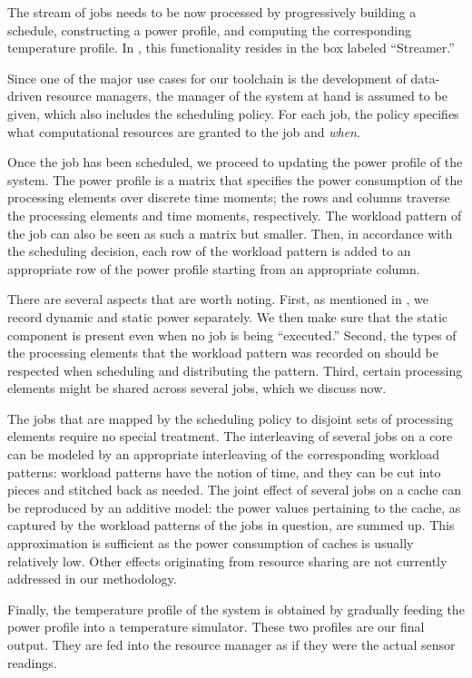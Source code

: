 The stream of jobs needs to be now processed by progressively building a
schedule, constructing a power profile, and computing the corresponding
temperature profile. In , this functionality resides in the
box labeled ``Streamer.''

Since one of the major use cases for our toolchain is the development of
data-driven resource managers, the manager of the system at hand is assumed to
be given, which also includes the scheduling policy. For each job, the policy
specifies what computational resources are granted to the job and \emph{when}.

Once the job has been scheduled, we proceed to updating the power profile of the
system. The power profile is a matrix that specifies the power consumption of
the processing elements over discrete time moments; the rows and columns
traverse the processing elements and time moments, respectively. The workload
pattern of the job can also be seen as such a matrix but smaller. Then, in
accordance with the scheduling decision, each row of the workload pattern is
added to an appropriate row of the power profile starting from an appropriate
column.

There are several aspects that are worth noting. First, as mentioned in
, we record dynamic and static power separately. We then make
sure that the static component is present even when no job is being
``executed.'' Second, the types of the processing elements that the workload
pattern was recorded on should be respected when scheduling and distributing the
pattern. Third, certain processing elements might be shared across several jobs,
which we discuss now.

The jobs that are mapped by the scheduling policy to disjoint sets of processing
elements require no special treatment. The interleaving of several jobs on a
core can be modeled by an appropriate interleaving of the corresponding workload
patterns: workload patterns have the notion of time, and they can be cut into
pieces and stitched back as needed. The joint effect of several jobs on a cache
can be reproduced by an additive model: the power values pertaining to the
cache, as captured by the workload patterns of the jobs in question, are summed
up. This approximation is sufficient as the power consumption of caches is
usually relatively low. Other effects originating from resource sharing are not
currently addressed in our methodology.

Finally, the temperature profile of the system is obtained by gradually feeding
the power profile into a temperature simulator. These two profiles are our final
output. They are fed into the resource manager as if they were the actual sensor
readings.
